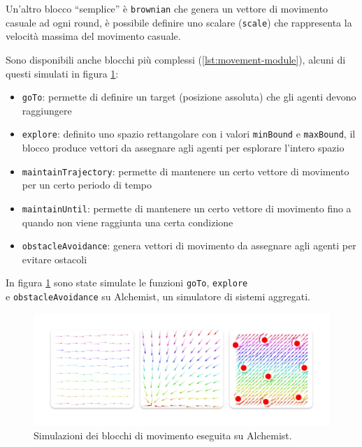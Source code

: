 \documentclass[12pt,a4paper,openright,twoside]{book}
\begin{document}
Un'altro blocco ``semplice'' è \verb|brownian| che genera un vettore di movimento casuale ad ogni round, è possibile definire uno scalare (\verb|scale|) che rappresenta la velocità massima del movimento casuale.

Sono disponibili anche blocchi più complessi (\cref{lst:movement-module}), alcuni di questi simulati in figura \ref{fig:movement-simulations}:
\begin{itemize}
    \item \verb|goTo|: permette di definire un target (posizione assoluta) che gli agenti devono raggiungere
    \item \verb|explore|: definito uno spazio rettangolare con i valori \verb|minBound| e \verb|maxBound|, il blocco produce vettori da assegnare agli agenti per esplorare l'intero spazio
    \item \verb|maintainTrajectory|: permette di mantenere un certo vettore di movimento per un certo periodo di tempo
    \item \verb|maintainUntil|: permette di mantenere un certo vettore di movimento fino a quando non viene raggiunta una certa condizione
    \item \verb|obstacleAvoidance|: genera vettori di movimento da assegnare agli agenti per evitare ostacoli
\end{itemize}

In figura \ref{fig:movement-simulations} \cite{Macroswarm} sono state simulate le funzioni \verb|goTo|, \verb|explore| \\ e \verb|obstacleAvoidance| su Alchemist, un simulatore di sistemi aggregati.

\begin{figure}
    \centering
    \includegraphics[width=.9\linewidth]{figures/movement-simulations.pdf}
    \caption{Simulazioni dei blocchi di movimento eseguita su Alchemist.}
    \label{fig:movement-simulations}
\end{figure}
\end{document}
